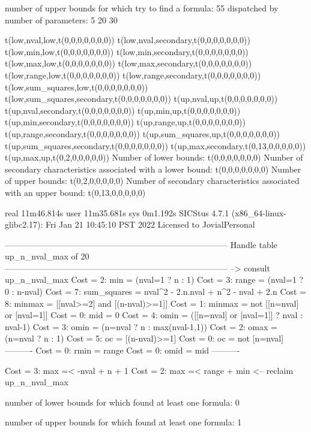 number of upper bounds for which try to find a formula: 55
dispatched by number of parameters: 5  20  30

t(low,nval,low,t(0,0,0,0,0,0,0))
t(low,nval,secondary,t(0,0,0,0,0,0,0))
t(low,min,low,t(0,0,0,0,0,0,0))
t(low,min,secondary,t(0,0,0,0,0,0,0))
t(low,max,low,t(0,0,0,0,0,0,0))
t(low,max,secondary,t(0,0,0,0,0,0,0))
t(low,range,low,t(0,0,0,0,0,0,0))
t(low,range,secondary,t(0,0,0,0,0,0,0))
t(low,sum_squares,low,t(0,0,0,0,0,0,0))
t(low,sum_squares,secondary,t(0,0,0,0,0,0,0))
t(up,nval,up,t(0,0,0,0,0,0,0))
t(up,nval,secondary,t(0,0,0,0,0,0,0))
t(up,min,up,t(0,0,0,0,0,0,0))
t(up,min,secondary,t(0,0,0,0,0,0,0))
t(up,range,up,t(0,0,0,0,0,0,0))
t(up,range,secondary,t(0,0,0,0,0,0,0))
t(up,sum_squares,up,t(0,0,0,0,0,0,0))
t(up,sum_squares,secondary,t(0,0,0,0,0,0,0))
t(up,max,secondary,t(0,13,0,0,0,0,0))
t(up,max,up,t(0,2,0,0,0,0,0))
Number of lower bounds:                                             t(0,0,0,0,0,0,0)
Number of secondary characteristics associated with a lower bound:  t(0,0,0,0,0,0,0)
Number of upper bounds:                                             t(0,2,0,0,0,0,0)
Number of secondary characteristics associated with an upper bound: t(0,13,0,0,0,0,0)

real	11m46.814s
user	11m35.681s
sys	0m1.192s
SICStus 4.7.1 (x86_64-linux-glibc2.17): Fri Jan 21 10:45:10 PST 2022
Licensed to JovialPersonal


--------------------------------------------------------------------------------
Handle table up_n_nval_max of 20
--------------------------------------------------------------------------------
--> consult up_n_nval_max
Cost =  2:  min         = (nval=1 ? n : 1)
Cost =  3:  range       = (nval=1 ? 0 : n-nval)
Cost =  7:  sum_squares = nval^2 - 2.n.nval + n^2 - nval + 2.n
Cost =  8:  minmax      = [[nval>=2] and [(n-nval)>=1]]
Cost =  1:  minmax      = not [[n=nval] or [nval=1]]
Cost =  0:  mid         = 0
Cost =  4:  omin        = ([[n=nval] or [nval=1]] ? nval : nval-1)
Cost =  3:  omin        = (n=nval ? n : max(nval-1,1))
Cost =  2:  omax        = (n=nval ? n : 1)
Cost =  5:  oc          = [(n-nval)>=1]
Cost =  0:  oc          = not [n=nval]
----------
Cost =  0:  rmin        = range
Cost =  0:  omid        = mid
----------

Cost =  3:  max =< -nval + n + 1
Cost =  2:  max =< range + min
<-- reclaim up_n_nval_max

number of lower bounds for which found at least one formula: 0

number of upper bounds for which found at least one formula: 1

